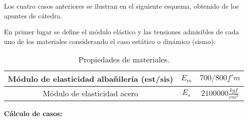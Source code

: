 Los cuatro casos anteriores se ilustran en el siguiente esquema, obtenido de los apuntes de cátedra.


En primer lugar se define el módulo elástico y las tensiones admisibles de cada uno de los materiales considerando el caso estático o dinámico (sismo):

\begin{table}[H]
  \centering
  \caption{Propiedades de materiales.}
  \begin{tabular}{|c|c|c|}
    \hline
    Módulo de elasticidad albañilería (est/sis) & $E_m$ & $700/800f'm$ \bigstrut\\
    \hline
    Módulo de elasticidad acero & $E_s$ & $2100000\frac{kgf}{cm^2}$ \bigstrut\\
    \hline
  \end{tabular}
\end{table}




\newpage
\textbf{Cálculo de casos:}

